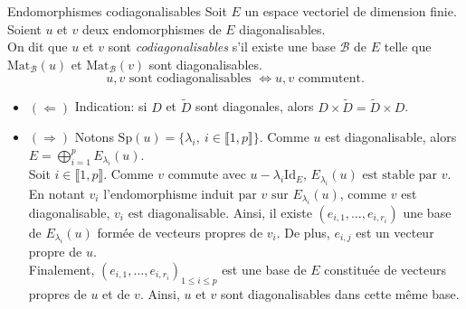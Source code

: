 \begin{box_titre}{Endomorphismes codiagonalisables}
    Soit $E$ un espace vectoriel de dimension finie. Soient $u$ et $v$ deux endomorphismes de $E$ diagonalisables. \\
    On dit que $u$ et $v$ sont \emph{codiagonalisables} s'il existe une base $\mathscr{B}$ de $E$ telle que $\mathrm{Mat}_\mathscr{B}(u)$ et $\mathrm{Mat}_\mathscr{B}(v)$ sont diagonalisables. 
    $$u, v \text{ sont codiagonalisables } \Longleftrightarrow u, v \text{ commutent}.$$
\end{box_titre}

\begin{itemize}
    \item $(\Leftarrow)$ Indication: si $D$ et $\widetilde{D}$ sont diagonales, alors $D \times \widetilde{D} = \widetilde{D} \times D$.
    \item $(\Rightarrow)$ Notons $\mathrm{Sp}(u) = \{ \lambda_i,\ i \in \llbracket1, p \rrbracket \}$. Comme $u$ est diagonalisable, alors $E = \bigoplus\limits_{i = 1}^{p} E_{\lambda_i}(u)$. \\
    Soit $i \in \llbracket 1, p \rrbracket$. Comme $v$ commute avec $u - \lambda_i \mathrm{Id}_E$, $\boxed{E_{\lambda_i}(u) \text{ est stable par } v}$. \\
    En notant $\boxed{v_i \text{ l'endomorphisme induit par } v \text{ sur } E_{\lambda_i}(u)}$, comme $v$ est diagonalisable, $\boxed{v_i \text{ est diagonalisable}}$. Ainsi, il existe $(e_{i, 1}, \dots, e_{i, r_i})$ une base de $E_{\lambda_i}(u)$ formée de vecteurs propres de $v_i$. De plus, $e_{i, j}$ est un vecteur propre de $u$. \\
    Finalement, $\boxed{(e_{i, 1}, \dots, e_{i, r_i})_{1 \leqslant i \leqslant p}}$ est une base de $E$ constituée de vecteurs propres de $u$ et de $v$. Ainsi, $u$ et $v$ sont diagonalisables dans cette même base. 
\end{itemize}